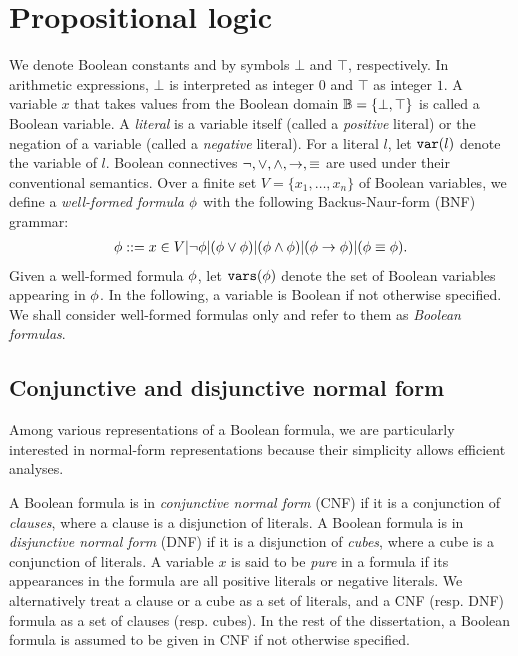 \section{Propositional logic}
\label{sect:propositional-logic}

We denote Boolean constants \false and \true by symbols $\bot$ and $\top$, respectively.
In arithmetic expressions, $\bot$ is interpreted as integer $0$ and $\top$ as integer $1$.
A variable $x$ that takes values from the Boolean domain $\mathbb{B}=\{\bot,\top\}$ is called a Boolean variable.
A \textit{literal} is a variable itself (called a \textit{positive} literal) or the negation of a variable (called a \textit{negative} literal).
For a literal $l$, let $\mathtt{var}(l)$ denote the variable of $l$.
Boolean connectives $\lnot, \lor, \land, \rightarrow, \equiv$ are used under their conventional semantics.
Over a finite set $V=\{x_1,\ldots,x_n\}$ of Boolean variables,
we define a \textit{well-formed formula} $\phi$ with the following Backus-Naur-form (BNF) grammar:
\begin{align}
    \phi ::= x\in V | \lnot\phi | (\phi\lor\phi) | (\phi\land\phi) | (\phi\rightarrow\phi) | (\phi\equiv\phi).
\end{align}
Given a well-formed formula $\phi$, let $\mathtt{vars}(\phi)$ denote the set of Boolean variables appearing in $\phi$.
In the following, a variable is Boolean if not otherwise specified.
We shall consider well-formed formulas only and refer to them as \textit{Boolean formulas}.

\subsection{Conjunctive and disjunctive normal form}
Among various representations of a Boolean formula,
we are particularly interested in normal-form representations because their simplicity allows efficient analyses.

A Boolean formula is in \textit{conjunctive normal form} (CNF) if it is a conjunction of \textit{clauses},
where a clause is a disjunction of literals.
A Boolean formula is in \textit{disjunctive normal form} (DNF) if it is a disjunction of \textit{cubes},
where a cube is a conjunction of literals.
A variable $x$ is said to be \textit{pure} in a formula if its appearances in the formula are all positive literals or negative literals.
We alternatively treat a clause or a cube as a set of literals,
and a CNF (resp. DNF) formula as a set of clauses (resp. cubes).
In the rest of the dissertation, a Boolean formula is assumed to be given in CNF if not otherwise specified.

